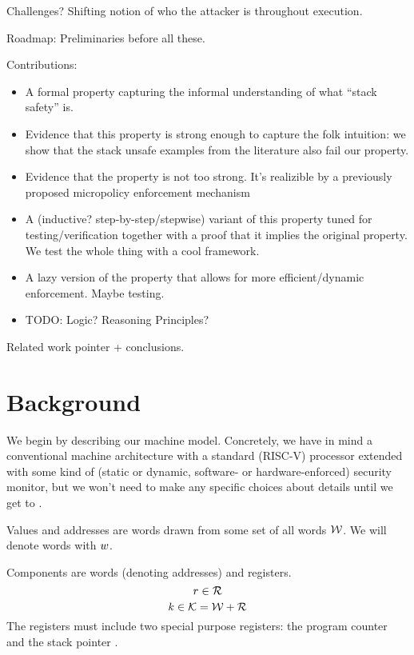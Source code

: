 \documentclass[acmsmall,review,anonymous]{acmart}\settopmatter{printfolios=true,printccs=false,printacmref=false}
\begin{document}
Challenges?
Shifting notion of who the attacker is throughout execution.

Roadmap: 
Preliminaries before all these.

Contributions:
\begin{itemize}
\item A formal property capturing the informal understanding of what ``stack safety'' is.
\item Evidence that this property is strong enough to capture the folk
intuition: we show that the stack
  unsafe examples from the literature also fail our property.
\item Evidence that the property is not too strong. It's realizible by
  a previously proposed  micropolicy enforcement mechanism 
\item A (inductive? step-by-step/stepwise) variant of this property
  tuned for testing/verification together with a proof that it implies
  the original property.  We test the whole thing with a cool
  framework.
\item A lazy version of the property that allows for more efficient/dynamic enforcement.
  Maybe testing.
\item TODO: Logic? Reasoning Principles?
\end{itemize}

Related work pointer + conclusions.

\section{Background}

We begin by describing our machine model. Concretely, we have in mind a
conventional machine architecture with a standard (RISC-V) processor
extended with some kind of (static or dynamic, software- or
hardware-enforced) security monitor, but we won't need to make any
specific choices about details until we get to .

Values and addresses are words drawn from some set of all words ${\mathcal W}$. We will
denote words with $w$.

Components are words (denoting addresses) and registers.
%
    \[r \in {\mathcal R}\]
    \[k \in {\mathcal K} = {\mathcal W} + {\mathcal R} \]
%
The registers must include two special purpose registers: the program
counter \PCname and the stack pointer \SP.
\end{document}

